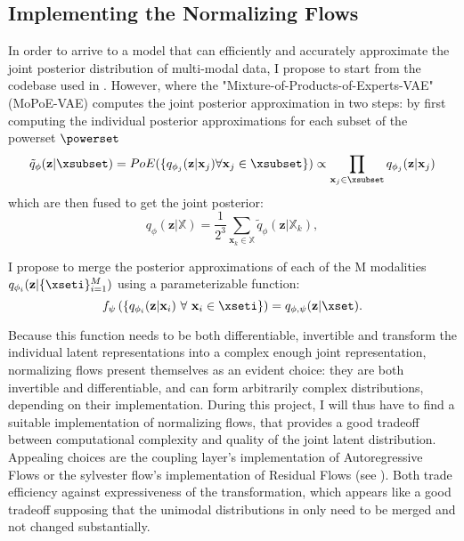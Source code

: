 \documentclass[english]{scrartcl}
\begin{document}
    \subsection{Implementing the Normalizing Flows}
    In order to arrive to a model that can efficiently and accurately approximate the joint posterior distribution of multi-modal data, I propose to start from the codebase used in \citet{sutter_generalized_2020}.
    However, where the "Mixture-of-Products-of-Experts-VAE" (MoPoE-VAE) computes the joint posterior approximation in two steps: %
    by first computing the individual posterior approximations for each subset of the powerset $\powerset$
    \begin{equation}
        \tilde{q}_{\phi}(\textbf{z}|\xsubset)=PoE(\{q_{\phi_j}(\textbf{z}|\textbf{x}_j) \forall \textbf{x}_j \in \xsubset\}) \propto \prod _{\textbf{x}_j \in \xsubset}q_{\phi_j}(\textbf{z}|\textbf{x}_j)
    \end{equation}
    which are then fused to get the joint posterior:
    \begin{equation}
        q_{\phi}(\textbf{z}|\mathbb{X}) = \frac{1}{2^3} \sum _{\textbf{x}_k \in \mathbb{X}} \tilde{q}_{\phi} (\textbf{z}|\mathbb{X}_k),
    \end{equation}

    I propose to merge the posterior approximations of each of the M modalities $q_{\phi_i}(\textbf{z}|\{\xseti\}_{i=1}^M)$ using a parameterizable function:
    \begin{equation}
        \label{eq:merge_function}
        f_{\psi}\left( \left\{ q_{\phi _i}(\textbf{z}|\textbf{x}_i)\ \forall\ \textbf{x}_i \in \xseti \right\} \right) = q_{\phi, \psi}(\textbf{z} | \xset).
    \end{equation}

    Because this function needs to be both differentiable, invertible and transform the individual latent representations into a complex enough joint representation, normalizing flows present themselves as an evident choice:
    they are both invertible and differentiable, and can form arbitrarily complex distributions, depending on their implementation.
    During this project, I will thus have to find a suitable implementation of normalizing flows, that provides a good tradeoff between computational complexity and quality of the joint latent distribution.
    Appealing choices are the coupling layer's implementation of Autoregressive Flows or the sylvester flow's implementation of Residual Flows (see ).
    Both trade efficiency against expressiveness of the transformation, which appears like a good tradeoff supposing that the unimodal distributions in  only need to be merged and not changed substantially.
\end{document}
